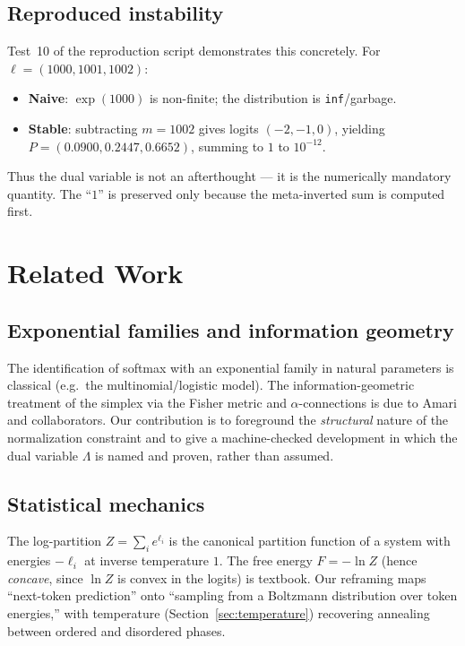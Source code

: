 \documentclass[11pt]{article}
\begin{document}
\subsection{Reproduced instability}
\label{sec:lse-rep}

Test~10 of the reproduction script demonstrates this concretely. For
$\ell=(1000,1001,1002)$:
\begin{itemize}
\item \textbf{Naive}: $\exp(1000)$ is non-finite; the distribution is
\texttt{inf}/garbage.
\item \textbf{Stable}: subtracting $m=1002$ gives logits
$(-2,-1,0)$, yielding $P=(0.0900,0.2447,0.6652)$, summing to $1$ to $10^{-12}$.
\end{itemize}
Thus the dual variable is not an afterthought --- it is the numerically
mandatory quantity. The ``$1$'' is preserved only because the meta-inverted sum
is computed first.

\section{Related Work}
\label{sec:related}

\subsection{Exponential families and information geometry}
\label{sec:rel-ef}

The identification of softmax with an exponential family in natural parameters
is classical (e.g.\ the multinomial/logistic model). The information-geometric
treatment of the simplex via the Fisher metric and $\alpha$-connections is due
to Amari and collaborators. Our contribution is to foreground the
\emph{structural} nature of the normalization constraint and to give a
machine-checked development in which the dual variable $\Lambda$ is named and
proven, rather than assumed.

\subsection{Statistical mechanics}
\label{sec:rel-sm}

The log-partition $Z=\sum_i e^{\ell_i}$ is the canonical partition function of a
system with energies $-\ell_i$ at inverse temperature $1$. The free energy
$F=-\ln Z$ (hence \emph{concave}, since $\ln Z$ is convex in the logits) is
textbook. Our reframing maps ``next-token
prediction'' onto ``sampling from a Boltzmann distribution over token
energies,'' with temperature (Section~\ref{sec:temperature}) recovering
annealing between ordered and disordered phases.
\end{document}
